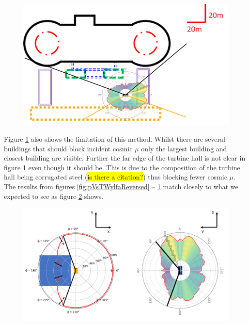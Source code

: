  \begin{figure}[htbp]
 \centering
 \includegraphics[width=\linewidth]{Chapter5/Figs/wylfaRasterNew/wylfaCircular0-37.5Deg_Overlay.png}
 \label{fig:wylfaCircular0-37.5Deg_Overlay}
\end{figure}

Figure \ref{fig:wylfaCircular0-37.5Deg_Overlay} also shows the limitation of this method. Whilst there are several buildings that should block incident cosmic $\mu$ only the largest building and closest building are visible. Further the far edge of the turbine hall is not clear in figure \ref{fig:wylfaCircular0-37.5Deg_Overlay} even though it should be. This is due to the composition of the turbine hall being corrugated steel (\hl{is there a citation?}) thus blocking fewer cosmic $\mu$. The results from figures \ref{fig:pVsTWylfaReversed} -- \ref{fig:wylfaCircular0-37.5Deg_Overlay} match closely to what we expected to see as figure \ref{fig:sideBySideComparisonTopDownCirc} shows. 

 \begin{figure}[htbp]
 \centering
 \includegraphics[width=\linewidth]{Chapter5/Figs/wylfaRasterNew/sideBySideComparisonTopDownCirc.png}
 \label{fig:sideBySideComparisonTopDownCirc}
\end{figure}


